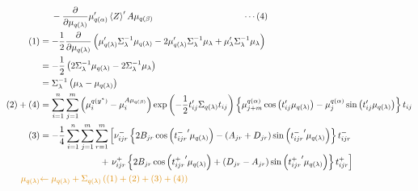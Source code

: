 \documentclass[11pt]{article}
\begin{document}
\begin{align*}
  &\quad\; -\frac{\partial}{\partial \mu_{q\left(\lambda\right)}} \mu_{q\left(\alpha\right)}'\left\langle Z \right\rangle'A\mu_{q\left(\beta\right)}\qquad \qquad \qquad \qquad \quad \; \;\;\; \cdots (4)\\
  (1) &= -\frac{1}{2}\frac{\partial}{\partial \mu_{q\left(\lambda\right)}} \left(\mu_{q\left(\lambda\right)}'\Sigma_{\lambda}^{-1}\mu_{q\left(\lambda\right)} -2\mu_{q\left(\lambda\right)}'\Sigma_{\lambda}^{-1}\mu_{\lambda} +\mu_{\lambda}'\Sigma_{\lambda}^{-1}\mu_{\lambda} \right)\\
  &= -\frac{1}{2}\left(2\Sigma_{\lambda}^{-1}\mu_{q\left(\lambda\right)} -2\Sigma_{\lambda}^{-1}\mu_{\lambda}\right)\\
  &= \Sigma_{\lambda}^{-1}\left(\mu_{\lambda}-\mu_{q\left(\lambda\right)}\right)\\
  (2)+(4) &= \sum_{i=1}^{n}\sum_{j=1}^{m} \left(\mu_{i}^{q\left(y^{*}\right)}-\mu_{i}^{A\mu_{q\left(\beta\right)}} \right)\exp\left(-\frac{1}{2}t_{ij}'\Sigma_{q\left(\lambda\right)}t_{ij} \right)\left\{\mu_{j+m}^{q\left(\alpha\right)}\cos \left(t_{ij}'\mu_{q\left(\lambda\right)}\right) -\mu_{j}^{q\left(\alpha\right)}\sin \left(t_{ij}'\mu_{q\left(\lambda\right)}\right) \right\}t_{ij}\\
  (3) &= -\frac{1}{4}\sum_{i=1}^{n}\sum_{j=1}^{m}\sum_{r=1}^{m}\left[\nu_{ijr}^{-} \left\{2B_{jr}\cos \left({t_{ijr}^{-}}'\mu_{q\left(\lambda\right)} \right)-\left(A_{jr}+D_{jr}\right)\sin\left({t_{ijr}^{-}}'\mu_{q\left(\lambda\right)} \right) \right\}t_{ijr}^{-} \right.\\
  &\quad \qquad \qquad \quad \;\;\,+\left. \nu_{ijr}^{+}\left\{2B_{jr}\cos \left({t_{ijr}^{+}}'\mu_{q\left(\lambda\right)}\right) +\left(D_{jr}-A_{jr}\right)\sin\left({t_{ijr}^{+}}'\mu_{q\left(\lambda\right)} \right)  \right\}t_{ijr}^{+} \right]\\
  \textcolor{myorange}{\mu_{q\left(\lambda\right)}} &\textcolor{myorange}{\leftarrow \mu_{q\left(\lambda\right)} +\Sigma_{q\left(\lambda\right)}\left((1)+(2)+(3)+(4) \right)}
\end{align*}
\end{document}
